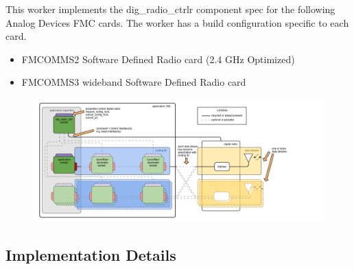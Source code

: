 \documentclass{article}
\begin{document}
  This worker implements the dig\_radio\_ctrlr component
  spec\cite{dig_radio_ctrlr_comp_datasheet} for the
  following Analog Devices FMC cards. The worker has a build configuration
  specific to each card.
  \begin{itemize}
    \item FMCOMMS2 Software Defined Radio card
      (2.4 GHz Optimized)\cite{fmcomms2_website}
    \item FMCOMMS3 wideband Software Defined Radio
      card\cite{fmcomms3_website}
  \end{itemize}

  \begin{center}
    \begin{figure}[h]
      \centering\captionsetup{type=figure}\includegraphics[scale=0.42]{dig_radio_ctrlr}
      \label{fig:blockdiagram}
    \end{figure}
  \end{center}

  \subsection{Implementation Details}
\end{document}
